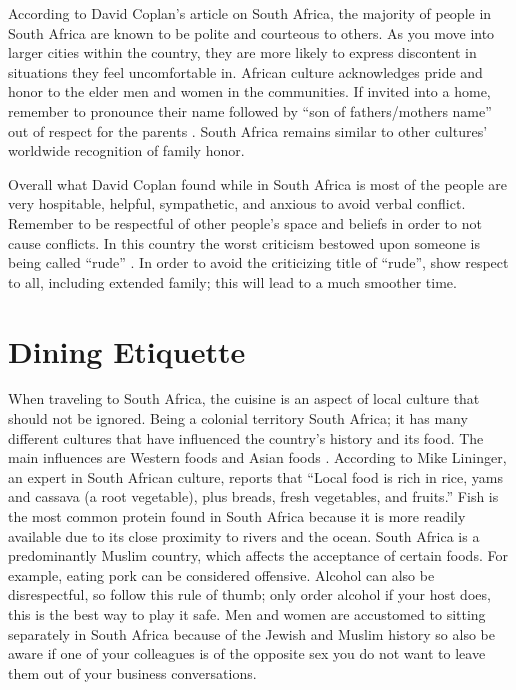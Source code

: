 \documentclass[11pt,a4paper,twoside]{report}
\begin{document}
According to David Coplan’s article on South Africa, the majority of people in
South Africa are known to be polite and courteous to others. As you move into
larger cities within the country, they are more likely to express discontent in
situations they feel uncomfortable in. African culture acknowledges pride and
honor to the elder men and women in the communities. If invited into a home,
remember to pronounce their name followed by “son of fathers/mothers name” out
of respect for the parents \citep*{coplan}. South Africa remains similar to
other cultures’ worldwide recognition of family honor.


Overall what David Coplan found while in South Africa is most of the people are
very hospitable, helpful, sympathetic, and anxious to avoid verbal conflict.
Remember to be respectful of other people’s space and beliefs in order to not
cause conflicts. In this country the worst criticism bestowed upon someone is
being called “rude” \citep*{coplan}.  In order to avoid the criticizing title of
“rude”, show respect to all, including extended family; this will lead to a
much smoother time.

\section{Dining Etiquette}

When traveling to South Africa, the cuisine is an aspect of local culture that
should not be ignored. Being a colonial territory South Africa; it has many
different cultures that have influenced the country’s history and its food. The
main influences are Western foods and Asian foods \citep*{lininger}.  According
to Mike Lininger, an expert in South African culture, reports that “Local food
is rich in rice, yams and cassava (a root vegetable), plus breads, fresh
vegetables, and fruits.” Fish is the most common protein found in South Africa
because it is more readily available due to its close proximity to rivers and
the ocean. South Africa is a predominantly Muslim country, which affects the
acceptance of certain foods. For example, eating pork can be considered
offensive.  Alcohol can also be disrespectful, so follow this rule of thumb;
only order alcohol if your host does, this is the best way to play it safe. Men
and women are accustomed to sitting separately in South Africa because of the
Jewish and Muslim history so also be aware if one of your colleagues is of the
opposite sex you do not want to leave them out of your business conversations.
\end{document}
